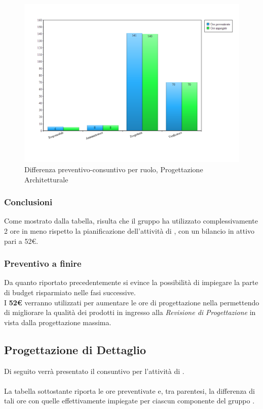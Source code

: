 \begin{figure}[H]
	\centering
	\includegraphics[scale=0.4]{immagini/Grafi/ProgettazioneArchitetturale_oreRuolo.png}
	\caption{Differenza preventivo-consuntivo per ruolo, Progettazione Architetturale}
\end{figure}
\FloatBarrier

\subsubsection{Conclusioni}

Come mostrato dalla tabella, risulta che il gruppo ha utilizzato complessivamente 2 ore in meno rispetto la pianificazione dell'attività di \textit{\PA}, con un bilancio in attivo pari a 52€.

\subsubsection{Preventivo a finire}
Da quanto riportato precedentemente si evince la possibilità di impiegare la parte di budget risparmiato nelle fasi successive. \\
I \textbf{52€} verranno utilizzati per aumentare le ore di progettazione nella \textbf{\PD} permettendo di migliorare la qualità dei prodotti in ingresso alla \textit{Revisione di Progettazione} in vista dalla progettazione massima.

\newpage
\subsection{Progettazione di Dettaglio}
Di seguito verrà presentato il consuntivo per l'attività di \textit{\PD}.
\\\\
La tabella sottostante riporta le ore preventivate e, tra parentesi, la differenza di tali ore con quelle effettivamente impiegate per ciascun componente del gruppo \gruppo.

